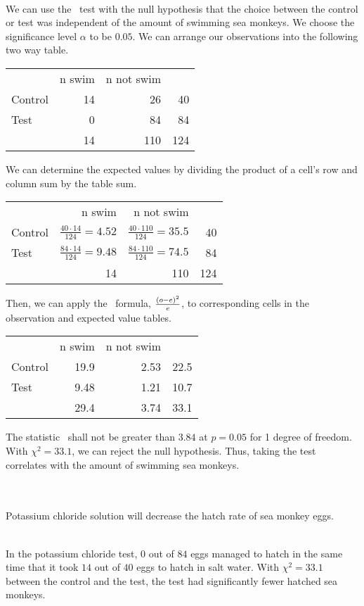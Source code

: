 \documentclass[12pt]{article}
\begin{document}
\\
We can use the \chisq\ test with the null hypothesis that the choice between the control or test was independent of the amount of
swimming sea monkeys. We choose the significance level $\alpha$ to be $0.05$. We can arrange our observations into the following
two way table.
%
\begin{center}
\begin{tabular}{lrr|r}
& n swim & n not swim & \\
Control & 14 & 26 & 40 \\
Test & 0 & 84 & 84 \\\hline
& 14 & 110 & 124
\end{tabular}
\end{center}
%
We can determine the expected values by dividing the product of a cell's row and column sum by the table sum.
%
\begin{center}
\begin{tabular}{lrr|r}
& n swim & n not swim & \\
Control & $\frac{40\cdot{14}}{124}=4.52$ & $\frac{40\cdot{110}}{124}=35.5$ & 40 \\
Test & $\frac{84\cdot{14}}{124}=9.48$ & $\frac{84\cdot{110}}{124}=74.5$ & 84 \\\hline
& 14 & 110 & 124
\end{tabular}
\end{center}
%
Then, we can apply the \chisq\ formula, $\frac{\left({o-e}\right)^2}{e}$, to corresponding cells in the observation and expected value
tables.
%
\begin{center}
\begin{tabular}{lrr|r}
& n swim & n not swim & \\
Control & 19.9 & 2.53 & 22.5 \\
Test & 9.48 & 1.21 & 10.7 \\\hline
& 29.4 & 3.74 & 33.1
\end{tabular}
\end{center}
%
The statistic \chisq\ shall not be greater than $3.84$ at $p=0.05$ for 1 degree of freedom. With $\chi^2=33.1$, we can reject the
null hypothesis. Thus, taking the test correlates with the amount of swimming sea monkeys.\double

\\
\\
Potassium chloride solution will decrease the hatch rate of sea monkey eggs.\double

\\
In the potassium chloride test, $0$ out of $84$ eggs managed to hatch in the same time that it took $14$ out of $40$ eggs to hatch
in salt water. With $\chi^2=33.1$ between the control and the test, the test had significantly fewer hatched sea monkeys.\double
\end{document}
